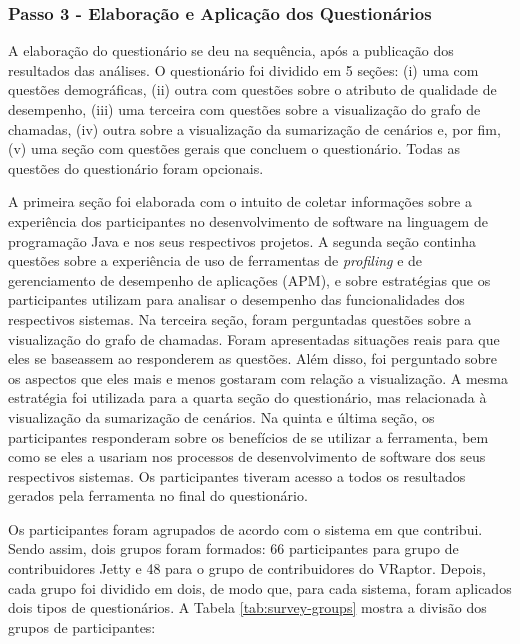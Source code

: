 \subsubsection{Passo 3 - Elaboração e Aplicação dos Questionários} \label{subsec:avaliacao-procedimentos-passo-3}

A elaboração do questionário se deu na sequência, após a publicação dos resultados das análises. O questionário foi dividido em 5 seções: (i) uma com questões demográficas, (ii) outra com questões sobre o atributo de qualidade de desempenho, (iii) uma terceira com questões sobre a visualização do grafo de chamadas, (iv) outra sobre a visualização da sumarização de cenários e, por fim, (v) uma seção com questões gerais que concluem o questionário. Todas as questões do questionário foram opcionais.

A primeira seção foi elaborada com o intuito de coletar informações sobre a experiência dos participantes no desenvolvimento de software na linguagem de programação Java e nos seus respectivos projetos. A segunda seção continha questões sobre a experiência de uso de ferramentas de \textit{profiling} e de gerenciamento de desempenho de aplicações (APM), e sobre estratégias que os participantes utilizam para analisar o desempenho das funcionalidades dos respectivos sistemas. Na terceira seção, foram perguntadas questões sobre a visualização do grafo de chamadas. Foram apresentadas situações reais para que eles se baseassem ao responderem as questões. Além disso, foi perguntado sobre os aspectos que eles mais e menos gostaram com relação a visualização. A mesma estratégia foi utilizada para a quarta seção do questionário, mas relacionada à visualização da sumarização de cenários. Na quinta e última seção, os participantes responderam sobre os benefícios de se utilizar a ferramenta, bem como se eles a usariam nos processos de desenvolvimento de software dos seus respectivos sistemas. Os participantes tiveram acesso a todos os resultados gerados pela ferramenta no final do questionário.

Os participantes foram agrupados de acordo com o sistema em que contribui. Sendo assim, dois grupos foram formados: 66 participantes para grupo de contribuidores Jetty e 48 para o grupo de contribuidores do VRaptor. Depois, cada grupo foi dividido em dois, de modo que, para cada sistema, foram aplicados dois tipos de questionários. A Tabela \ref{tab:survey-groups} mostra a divisão dos grupos de participantes:

